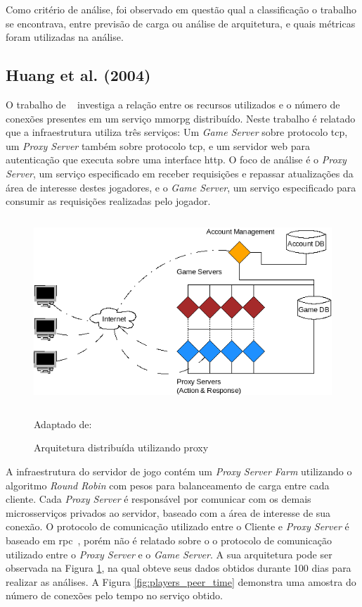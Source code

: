 Como critério de análise, foi observado em questão qual a classificação o trabalho se encontrava, entre previsão de carga ou análise de arquitetura, e quais métricas foram utilizadas na análise.

\subsection{Huang et al. (2004)}
\label{sec:huang}



O trabalho de ~\cite{1417630} investiga a relação entre os recursos utilizados e o número de conexões presentes em um serviço \ac{mmorpg} distribuído.
%
Neste trabalho é relatado que a infraestrutura utiliza três serviços: Um \textit{Game Server} sobre protocolo \ac{tcp}, um \textit{Proxy Server} também sobre protocolo \ac{tcp}, e um servidor web para autenticação que executa sobre uma interface \ac{http}.
%
O foco de análise é o \textit{Proxy Server}, um serviço especificado em receber requisições e repassar atualizações da área de interesse destes jogadores, e o \textit{Game Server}, um serviço especificado para consumir as requisições realizadas pelo jogador.



\begin{figure}[htb!]
\caption{Arquitetura distribuída utilizando proxy}
\label{fig:game_with_proxy}
\includegraphics[height=7cm]{img/cap2/game_with_proxy.png}
\centering

Adaptado de:~\cite{1417630}
\end{figure}



A infraestrutura do servidor de jogo contém um \textit{Proxy Server Farm} utilizando o algoritmo \textit{Round Robin} com pesos para balanceamento de carga entre cada cliente.
%
Cada \textit{Proxy Server} é responsável por comunicar com os demais microsserviços privados ao servidor, baseado com a área de interesse de sua conexão.
%
O protocolo de comunicação utilizado entre o Cliente e \textit{Proxy Server} é baseado em \ac{rpc}~\cite{faber, borella}, porém não é relatado sobre o o protocolo de comunicação utilizado entre o \textit{Proxy Server} e o \textit{Game Server}.
%
A sua arquitetura pode ser observada na Figura \ref{fig:game_with_proxy}, na qual obteve seus dados obtidos durante 100 dias para realizar as análises.
%
A Figura \ref{fig:players_peer_time} demonstra uma amostra do número de conexões pelo tempo no serviço obtido.




